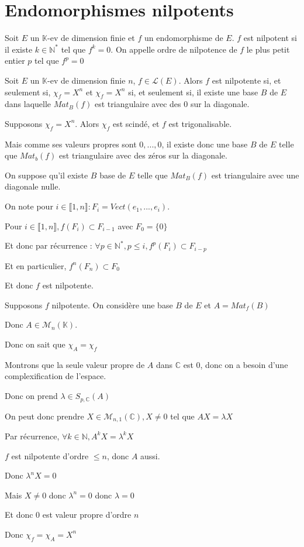 \documentclass[a4paper,12pt]{book}
\newcommand{\Def}[2]{\begin{tcolorbox}[sharp corners, colback=white,colframe=blue!90!black!75, title=Définition : #1]#2\end{tcolorbox}}
\newcommand{\Thr}[2]{\begin{tcolorbox}[sharp corners, colback=white,colframe=red!90!black!75, title=Théorème : #1]#2\end{tcolorbox}}
\newcommand{\Pre}[1]{\begin{tcolorbox}[sharp corners, colback=white,colframe=green!60!green!30!black!75, title=Preuve]#1\end{tcolorbox}}
\def\C{\mathbb{C}}
\def\N{\mathbb{N}}
\def\K{\mathbb{K}}
\begin{document}
\section{Endomorphismes nilpotents}
\Def{Nilpotence}{Soit $E$ un $\K$-ev de dimension finie et $f$ un endomorphisme de $E$. $f$ est nilpotent si il existe $k\in\N^*$ tel que $f^k=0$. On appelle ordre de nilpotence de $f$ le plus petit entier $p$ tel que $f^p=0$}
\Thr{}{Soit $E$ un $\K$-ev de dimension finie $n$, $f\in\mathcal{L}(E)$. Alors $f$ est nilpotente si, et seulement si, $\chi_f = X^n$ et $\chi_f=X^n$ si, et seulement si, il existe une base $B$ de $E$ dans laquelle $Mat_B(f)$ est triangulaire avec des 0 sur la diagonale.}
\Pre{Supposons $\chi_f=X^n$. Alors $\chi_f$ est scindé, et $f$ est trigonalisable. \par Mais comme ses valeurs propres sont $0,...,0$, il existe donc une base $B$ de $E$ telle que $Mat_b(f)$ est triangulaire avec des zéros sur la diagonale.
\par On suppose qu'il existe $B$ base de $E$ telle que $Mat_B(f)$ est triangulaire avec une diagonale nulle. \par On note pour $i\in\llbracket 1,n\rrbracket : F_i = Vect(e_1,...,e_i)$. \par Pour $i\in\llbracket 1,n\rrbracket, f(F_i)\subset F_{i-1}$ avec $F_0=\{0\}$ \par Et donc par récurrence : $\forall p\in\N^*, p\leq i, f^p(F_i)\subset F_{i-p}$ \par Et en particulier, $f^n(F_n)\subset F_0$ \par Et donc $f$ est nilpotente.
\par Supposons $f$ nilpotente. On considère une base $B$ de $E$ et $A = Mat_f(B)$ \par Donc $A\in\mathcal{M}_n(\K)$. \par Donc on sait que $\chi_A = \chi_f$ \par Montrons que la seule valeur propre de $A$ dans $\C$ est $0$, donc on a besoin d'une complexification de l'espace. \par Donc on prend $\lambda \in S_{p,\C}(A)$ \par On peut donc prendre $X\in\mathcal{M}_{n,1}(\C), X\neq 0$ tel que $AX=\lambda X$ \par Par récurrence, $\forall k\in\N, A^kX = \lambda^kX$ \par $f$ est nilpotente d'ordre $\leq n$, donc $A$ aussi. \par Donc $\lambda^nX = 0$ \par Mais $X\neq 0$ donc $\lambda^n=0$ donc $\lambda=0$ \par Et donc $0$ est valeur propre d'ordre $n$ \par Donc $\chi_f=\chi_A=X^n$}
\end{document}
